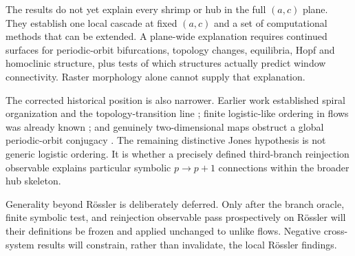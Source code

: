 The results do not yet explain every shrimp or hub in the full $(a,c)$ plane.
They establish one local cascade at fixed $(a,c)$ and a set of computational
methods that can be extended.  A plane-wide explanation requires continued
surfaces for periodic-orbit bifurcations, topology changes, equilibria, Hopf and
homoclinic structure, plus tests of which structures actually predict window
connectivity.  Raster morphology alone cannot supply that explanation.

The corrected historical position is also narrower.  Earlier work established
spiral organization and the topology-transition line
\citep{barrio2011global}; finite logistic-like ordering in flows was already
known \citep{lefranc1994combining}; and genuinely two-dimensional maps obstruct
a global periodic-orbit conjugacy \citep{holmes1984bifurcation}.  The remaining
distinctive Jones hypothesis is not generic logistic ordering.  It is whether
a precisely defined third-branch reinjection observable explains particular
symbolic $p\mathbin{\to}p+1$ connections within the broader hub skeleton.

Generality beyond R{\"o}ssler is deliberately deferred.  Only after the branch
oracle, finite symbolic test, and reinjection observable pass prospectively on
R{\"o}ssler will their definitions be frozen and applied unchanged to unlike
flows.  Negative cross-system results will constrain, rather than invalidate,
the local R{\"o}ssler findings.
